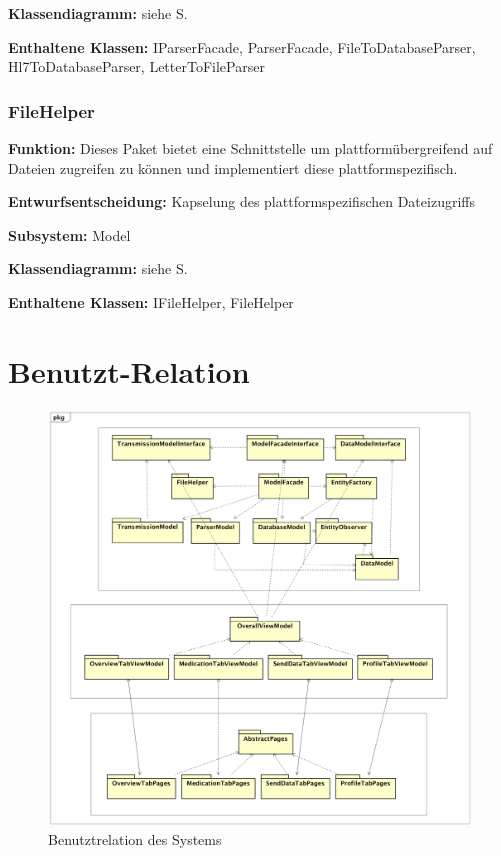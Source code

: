 \documentclass[a4paper]{scrreprt}
\begin{document}
\textbf{Klassendiagramm:} siehe S.

\textbf{Enthaltene Klassen:} IParserFacade, ParserFacade, FileToDatabaseParser, Hl7ToDatabaseParser, LetterToFileParser

\subsubsection{FileHelper}
\textbf{Funktion:} Dieses Paket bietet eine Schnittstelle um plattformübergreifend auf Dateien zugreifen zu können und implementiert diese plattformspezifisch.

\textbf{Entwurfsentscheidung:} Kapselung des plattformspezifischen Dateizugriffs

\textbf{Subsystem:} Model

\textbf{Klassendiagramm:} siehe S.

\textbf{Enthaltene Klassen:} IFileHelper, FileHelper

\section{Benutzt-Relation}
\begin{figure}[H]
\centering
\includegraphics[width=0.75\textheight]{graphics/Klassendiagramme/CombinePackages.png}
\caption{Benutztrelation des Systems}
\end{figure}
\end{document}

